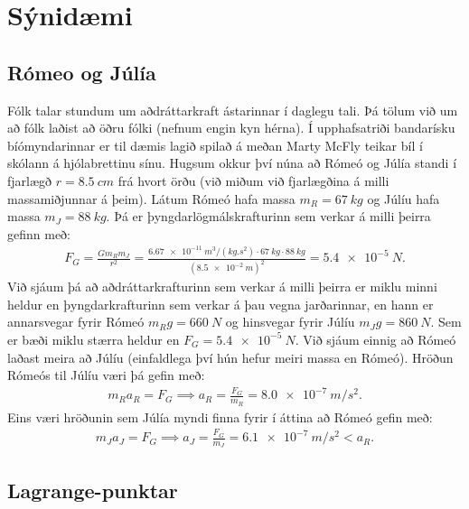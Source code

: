 \ifdefined \wholebook \else\documentclass[oneside]{book}\usepackage{EdlBook}\graphicspath{{figures/}}
\begin{document}
\section{Sýnidæmi}

\subsection*{Rómeo og Júlía}

Fólk talar stundum um aðdráttarkraft ástarinnar í daglegu tali. Þá tölum við um að fólk laðist að öðru fólki (nefnum engin kyn hérna). Í upphafsatriði bandarísku bíómyndarinnar  er til dæmis lagið   spilað á meðan Marty McFly teikar bíl í skólann á hjólabrettinu sínu. Hugsum okkur því núna að Rómeó og Júlía standi í fjarlægð $r = \SI{8.5}{cm}$ frá hvort örðu (við miðum við fjarlægðina á milli massamiðjunnar á þeim). Látum Rómeó hafa massa $m_R = \SI{67}{kg}$ og Júlíu hafa massa $m_J = \SI{88}{kg}$. Þá er þyngdarlögmálskrafturinn sem verkar á milli þeirra gefinn með:
\begin{align*}
    F_G = \frac{Gm_R m_J}{r^2} = \frac{\SI{6.67e-11}{m^3/(kg.s^2)} \cdot \SI{67}{kg}\cdot\SI{88}{kg}}{(\SI{8.5e-2}{m})^2} = \SI{5.4e-5}{N}.
\end{align*}
Við sjáum þá að aðdráttarkrafturinn sem verkar á milli þeirra er miklu minni heldur en þyngdarkrafturinn sem verkar á þau vegna jarðarinnar, en hann er annarsvegar fyrir Rómeó $m_R g = \SI{660}{N}$ og hinsvegar fyrir Júlíu $m_Jg = \SI{860}{N}$. Sem er bæði miklu stærra heldur en $F_G = \SI{5.4e-5}{N}$. Við sjáum einnig að Rómeó laðast meira að Júlíu (einfaldlega því hún hefur meiri massa en Rómeó). Hröðun Rómeós til Júlíu væri þá gefin með:
\begin{align*}
    m_R a_R = F_G \implies a_R = \frac{F_G}{m_R} = \SI{8.0e-7}{m/s^2}.
\end{align*}
Eins væri hröðunin sem Júlía myndi finna fyrir í áttina að Rómeó gefin með:
\begin{align*}
    m_J a_J = F_G \implies a_J = \frac{F_G}{m_J} = \SI{6.1e-7}{m/s^2} < a_R.
\end{align*}

\newpage

\subsection*{Lagrange-punktar}
\end{document}
